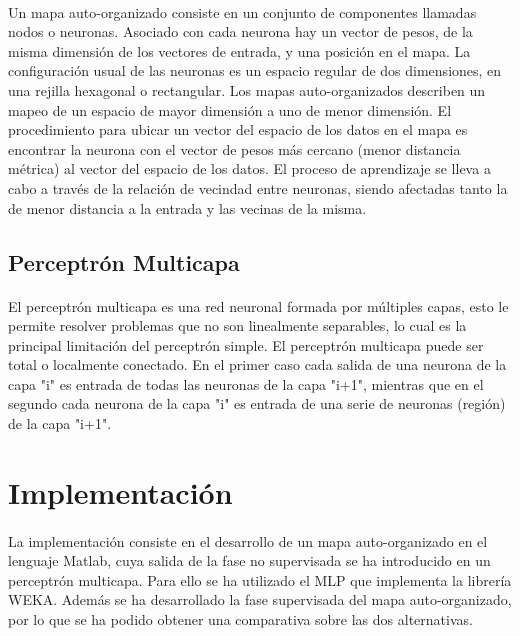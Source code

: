 \documentclass[10pt, a4paper,spanish]{article}
\begin{document}
			\paragraph{}
			Un mapa auto-organizado consiste en un conjunto de componentes llamadas nodos o neuronas. Asociado con cada neurona hay un vector de pesos, de la misma dimensión de los vectores de entrada, y una posición en el mapa. La configuración usual de las neuronas es un espacio regular de dos dimensiones, en una rejilla hexagonal o rectangular. Los mapas auto-organizados describen un mapeo de un espacio de mayor dimensión a uno de menor dimensión. El procedimiento para ubicar un vector del espacio de los datos en el mapa es encontrar la neurona con el vector de pesos más cercano (menor distancia métrica) al vector del espacio de los datos. El proceso de aprendizaje se lleva a cabo a través de la relación de vecindad entre neuronas, siendo afectadas tanto la de menor distancia a la entrada y las vecinas de la misma. \cite{wikipedia:som}


		\subsection{Perceptrón Multicapa}

			\paragraph{}
			El perceptrón multicapa es una red neuronal formada por múltiples capas, esto le permite resolver problemas que no son linealmente separables, lo cual es la principal limitación del perceptrón simple. El perceptrón multicapa puede ser total o localmente conectado. En el primer caso cada salida de una neurona de la capa "i" es entrada de todas las neuronas de la capa "i+1", mientras que en el segundo cada neurona de la capa "i" es entrada de una serie de neuronas (región) de la capa "i+1". \cite{wikipedia:mlp}

	\clearpage
	\section{Implementación}

		\paragraph{}
		La implementación consiste en el desarrollo de un mapa auto-organizado en el lenguaje Matlab, cuya salida de la fase no supervisada se ha introducido en un perceptrón multicapa. Para ello se ha utilizado el MLP que implementa la librería WEKA. Además se ha desarrollado la fase supervisada del mapa auto-organizado, por lo que se ha podido obtener una comparativa sobre las dos alternativas.
\end{document}
